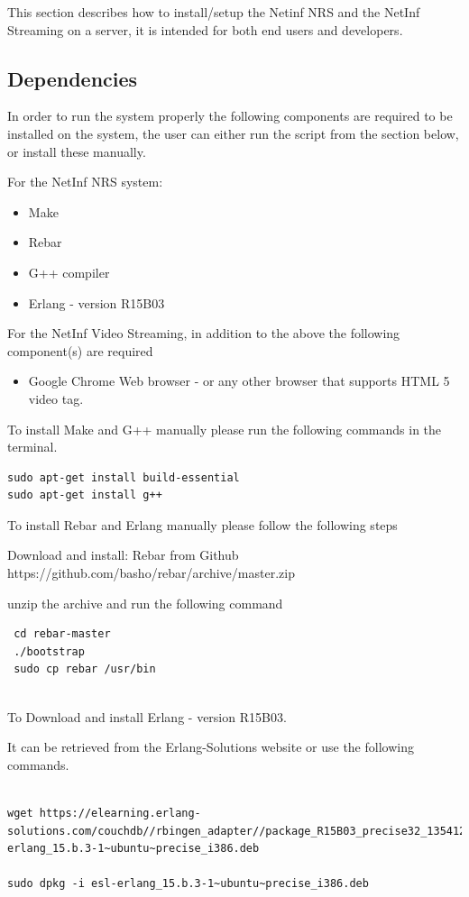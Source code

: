 This section describes how to install/setup the Netinf NRS and the NetInf Streaming on a server, it is intended for both end users and developers.

\subsection{Dependencies}

In order to run the system properly the following components are required to be installed on the system, the user can either run the script from the section below, or install these manually.

For the NetInf NRS system:
\begin{itemize}
\item Make
\item Rebar
\item G++ compiler
\item Erlang - version R15B03
\end{itemize}

For the NetInf Video Streaming, in addition to the above the following component(s) are required
\begin{itemize}
\item Google Chrome Web browser - or any other browser that supports HTML 5 video tag.
\end{itemize}

To install Make and G++ manually please run the following commands in the terminal.
\begin{verbatim}
sudo apt-get install build-essential
sudo apt-get install g++
\end{verbatim}

To install Rebar and Erlang manually please follow the following steps

Download and install: Rebar from Github
https://github.com/basho/rebar/archive/master.zip

unzip the archive and run the following command
\begin{verbatim}
 cd rebar-master
 ./bootstrap
 sudo cp rebar /usr/bin
 
\end{verbatim}

To Download and install Erlang - version R15B03.

It can be retrieved from the Erlang-Solutions website or use the following commands.

\begin{verbatim}

wget https://elearning.erlang-solutions.com/couchdb//rbingen_adapter//package_R15B03_precise32_1354121173/esl-erlang_15.b.3-1~ubuntu~precise_i386.deb
 
sudo dpkg -i esl-erlang_15.b.3-1~ubuntu~precise_i386.deb

\end{verbatim}

